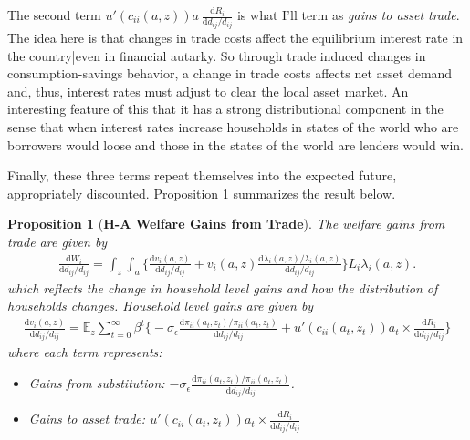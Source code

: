 \documentclass[12pt,pdftex]{article}
\newtheorem{prp}{Proposition}
\begin{document}
\begin{onehalfspacing}

The second term $u'(c_{ii}(a,z))a \ \frac{\mathrm{d} R_{i}}{\mathrm{d} d_{ij} / d_{ij}}$ is what I'll term as \emph{gains to asset trade}. The idea here is that changes in trade costs affect the equilibrium interest rate in the country|even in financial autarky. So through trade induced changes in consumption-savings behavior, a change in trade costs affects net asset demand and, thus, interest rates must adjust to clear the local asset market. An interesting feature of this that it has a strong distributional component in the sense that when interest rates increase households in states of the world who are borrowers would loose and those in the states of the world are lenders would win.

Finally, these three terms repeat themselves into the expected future, appropriately discounted. Proposition \ref{prp:gains-trade} summarizes the result below.
\begin{prp}[\textbf{H-A Welfare Gains from Trade}] \label{prp:gains-trade} The welfare gains from trade are given by
{\footnotesize
\begin{align}
\frac{\mathrm{d} W_{i}}{\mathrm{d} d_{ij} / d_{ij}} = \int_{z} \int_{a}  \bigg \{ \frac{\mathrm{d} v_i(a, z)}{\mathrm{d} d_{ij} / d_{ij}}  + v_{i}(a,z) \frac{\mathrm{d} \lambda_{i}(a,z)/ \lambda_{i}(a,z)}{\mathrm{d} d_{ij} / d_{ij}}  \bigg \} L_i \lambda_{i}(a,z).
\nonumber
\end{align}
}which reflects the change in household level gains and how the distribution of households changes. Household level gains are given by
{\footnotesize
\begin{align}
\nonumber
\frac{\mathrm{d} v_i(a, z)}{\mathrm{d} d_{ij} / d_{ij}} = \mathbb{E}_{z} \sum_{t = 0}^{\infty} \beta^{t} \bigg \{ -\sigma_{\epsilon} \frac{\mathrm{d} \pi_{ii}(a_{t},z_{t}) / \pi_{ii}(a_{t},z_{t})}{\mathrm{d}d_{ij} / d_{ij}} + u'(c_{ii}(a_{t},z_{t}))a_{t} \times \frac{\mathrm{d} R_{i}}{\mathrm{d} d_{ij} / d_{ij}} \bigg \}
\end{align}
}where each term represents:
\begin{itemize}
\item Gains from substitution: $-\sigma_{\epsilon} \frac{\mathrm{d} \pi_{ii}(a_{t},z_{t}) / \pi_{ii}(a_{t},z_{t})}{\mathrm{d}d_{ij} / d_{ij}}$.

\item Gains to asset trade: $u'(c_{ii}(a_{t},z_{t}))a_{t} \times \frac{\mathrm{d} R_{i}}{\mathrm{d} d_{ij} / d_{ij}}$
\end{itemize}
\end{prp}


\end{onehalfspacing}
\end{document}
